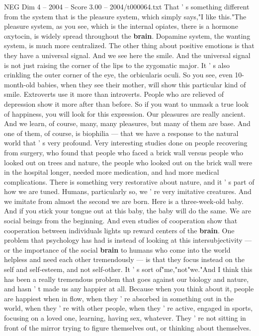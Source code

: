 \begin{textsample}{NEG Dim 4 – 2004 – Score 3.00 – 2004/t000064.txt}
That ' s something different from the system that is the pleasure system, which simply says,"I like this."The pleasure system, as you see, which is the internal opiates, there is a hormone oxytocin, is widely spread throughout the \textbf{brain}.
Dopamine system, the wanting system, is much more centralized.
The other thing about positive emotions is that they have a universal signal.
And we see here the smile.
And the universal signal is not just raising the corner of the lips to the zygomatic major.
It ' s also crinkling the outer corner of the eye, the orbicularis oculi.
So you see, even 10-month-old babies, when they see their mother, will show this particular kind of smile.
Extroverts use it more than introverts.
People who are relieved of depression show it more after than before.
So if you want to unmask a true look of happiness, you will look for this expression.
Our pleasures are really ancient.
And we learn, of course, many, many pleasures, but many of them are base.
And one of them, of course, is biophilia — that we have a response to the natural world that ' s very profound.
Very interesting studies done on people recovering from surgery, who found that people who faced a brick wall versus people who looked out on trees and nature, the people who looked out on the brick wall were in the hospital longer, needed more medication, and had more medical complications.
There is something very restorative about nature, and it ' s part of how we are tuned.
Humans, particularly so, we ' re very imitative creatures.
And we imitate from almost the second we are born.
Here is a three-week-old baby.
And if you stick your tongue out at this baby, the baby will do the same.
We are social beings from the beginning.
And even studies of cooperation show that cooperation between individuals lights up reward centers of the \textbf{brain}.
One problem that psychology has had is instead of looking at this intersubjectivity — or the importance of the social \textbf{brain} to humans who come into the world helpless and need each other tremendously — is that they focus instead on the self and self-esteem, and not self-other.
It ' s sort of"me,"not"we."And I think this has been a really tremendous problem that goes against our biology and nature, and hasn ' t made us any happier at all.
Because when you think about it, people are happiest when in flow, when they ' re absorbed in something out in the world, when they ' re with other people, when they ' re active, engaged in sports, focusing on a loved one, learning, having sex, whatever.
They ' re not sitting in front of the mirror trying to figure themselves out, or thinking about themselves.

\end{textsample}
